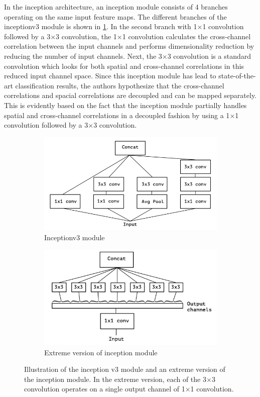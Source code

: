 In the inception architecture, an inception module consists of 4 branches operating on the same input feature maps. The different branches of the inceptionv3 module is shown in \ref{Fig:xceptiona}. In the second branch with 1$\times$1 convolution followed by a 3$\times$3 convolution, the 1$\times$1 convolution calculates the cross-channel correlation between the input channels and performs dimensionality reduction by reducing the number of input channels. Next, the 3$\times$3 convolution is a standard convolution which looks for both spatial and cross-channel correlations in this reduced input channel space. Since this inception module has lead to state-of-the-art classification results, the authors hypothesize that the cross-channel correlations and spacial correlations are decoupled and can be mapped separately. This is evidently based on the fact that the inception module partially handles spatial and cross-channel correlations in a decoupled fashion by using a 1$\times$1 convolution followed by a 3$\times$3 convolution. 

	\begin{figure}
		\begin{subfigure}{.5\textwidth}
			\centering
			\includegraphics[width=.8\linewidth]{images/inception_v3}
			\caption{Inceptionv3 module}
			\label{Fig:xceptiona}
		\end{subfigure}
		\begin{subfigure}{.5\textwidth}
			\centering
			\includegraphics[width=.8\linewidth]{images/extreme_inception}
			\caption{Extreme version of inception module}
			\label{Fig:xceptionb}
		\end{subfigure}
		\caption{Illustration of the inception v3 module and an extreme version of the inception module. In the extreme version, each of the 3$\times$3 convolution operates on a single output channel of 1$\times$1 convolution.}
		\label{Fig:xception}
	\end{figure}

